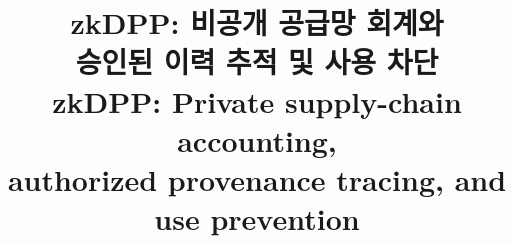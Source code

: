 \documentclass[10pt,a4paper,twocolumn]{article}
\title{\textbf{zkDPP: 비공개 공급망 회계와\\승인된 이력 추적 및 사용 차단}\\[0.5em]
\large zkDPP: Private supply-chain accounting,\\authorized provenance tracing, and use prevention}
\author{}
\date{}
\renewcommand{\thesection}{\Roman{section}}
\renewcommand{\thesubsection}{\arabic{section}.\arabic{subsection}}
\begin{document}
\maketitle
\vspace{-2.8em}









\begingroup
{}
\small
\raggedright


\endgroup
\clearpage
\appendix
\renewcommand{\thesection}{\Alph{section}}
\renewcommand{\thesubsection}{\Alph{section}.\arabic{subsection}}
\setcounter{equation}{0}
\renewcommand{\theequation}{A.\arabic{equation}}
\renewcommand{\theHequation}{appendix.\arabic{equation}}


\end{document}

